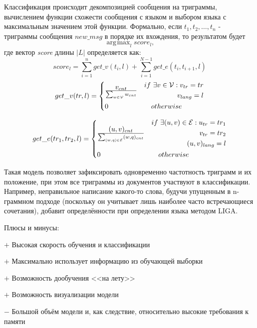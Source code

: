 \documentclass[a4paper, 14pt]{article}
\DeclareMathOperator*{\argmax}{\arg\!\max}
\begin{document}
		Классификация происходит декомпозицией сообщения на триграммы, вычислением функции схожести сообщения с языком и
		выбором языка с максимальным значением этой функции. Формально, если
		$t_{1}, t_{2}, \ldots, t_{n}$ - триграммы сообщения $new\_msg$ в порядке их вхождения, то результатом будет
		$$ \argmax_{l} score_{l} ,$$
		где вектор \textit{score} длины $|L|$ определяется как:
		$$ score_{l} = \sum_{i=1}^{n} get\_v(t_{i}, l) + \sum_{i=1}^{N-1} get\_e(t_{i}, t_{i+1}, l)$$
		\[
 		get\_v(tr, l) =
 		  \begin{dcases}
  		   v_{cnt} \over \sum_{w \in \mathcal{V}} w_{cnt} & 
  		   \begin{split} 
					 if \ \exists v \in \mathcal{V}: v_{tr}=tr \\ v_{lang}=l	
  		   	\end{split} \\
  		   0 & \quad otherwise
  		 \end{dcases}
		\]		
		
		\[
 		get\_e(tr_1, tr_2, l) =
 		  \begin{dcases}
  		   (u, v)_{cnt} \over \sum_{(w, q) \in \mathcal{E}} (w, q)_{cnt} & 
  		    \begin{split} 
					 if \ \exists (u, v) \in \mathcal{E}:  u_{tr}=tr_1 \\ v_{tr}=tr_2 \\ (u, v)_{lang}=l
  		   	\end{split} \\
  		   0 & \quad otherwise
  		 \end{dcases}
		\]	
		
		Такая модель позволяет зафиксировать одновременно частотность триграмм и их положение, при этом все триграммы
		из документов участвуют в классификации. Например, неправильное написание какого-то слова, будучи упущенным в n-граммном подходе (поскольку он
		учитывает лишь наиболее часто встречающиеся сочетания), добавит определённости при определении языка методом LIGA.		
		
		\noindent Плюсы и минусы:
		
		$+$ Высокая скорость обучения и классификации
		
		$+$ Максимально использует информацию из обучающей выборки
		
		$+$ Возможность дообучения <<на лету>>
		
		$+$ Возможность визуализации модели
		
		$-$ Большой объём модели и, как следствие, относительно высокие требования к памяти
			
\end{document}
